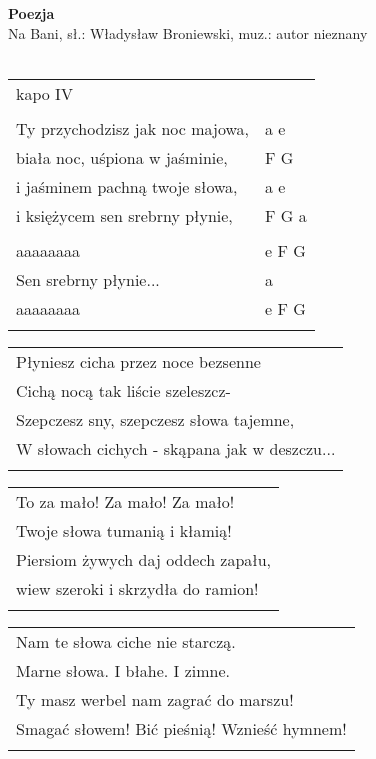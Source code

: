 \documentclass[a5paper]{article}
\begin{document}


\noindent
\noindent
\fontsize{12pt}{15pt}\selectfont
\textbf{Poezja} \\
\fontsize{8pt}{10pt}\selectfont
Na Bani, sł.: Władysław Broniewski, muz.: autor nieznany \\ \\
\fontsize{10pt}{12pt}\selectfont
{}
\begin{tabular}{@{}p{7.50cm}p{3cm}@{}}
\noindent
kapo IV \\ \\
Ty przychodzisz jak noc majowa, & a e \\
biała noc, uśpiona w jaśminie, & F G \\
i jaśminem pachną twoje słowa, & a e \\
i księżycem sen srebrny płynie, & F G a \\ \\
aaaaaaaa & e F G \\
Sen srebrny płynie... & a \\
aaaaaaaa & e F G \\ \\
\end{tabular}

\noindent
\begin{tabular}{@{}p{7.50cm}@{}}
Płyniesz cicha przez noce bezsenne \\
Cichą nocą tak liście szeleszcz- \\
Szepczesz sny, szepczesz słowa tajemne, \\
W słowach cichych - skąpana jak w deszczu... \\ \\
\end{tabular}

\noindent
\begin{tabular}{@{}p{7.50cm}@{}}
To za mało! Za mało! Za mało! \\ 
Twoje słowa tumanią i kłamią! \\
Piersiom żywych daj oddech zapału, \\
wiew szeroki i skrzydła do ramion! \\ \\
\end{tabular}

\noindent
\begin{tabular}{@{}p{7.50cm}@{}}
Nam te słowa ciche nie starczą. \\ 
Marne słowa. I błahe. I zimne. \\
Ty masz werbel nam zagrać do marszu! \\
Smagać słowem! Bić pieśnią! Wznieść hymnem! \\ \\
\end{tabular}
\end{document}
